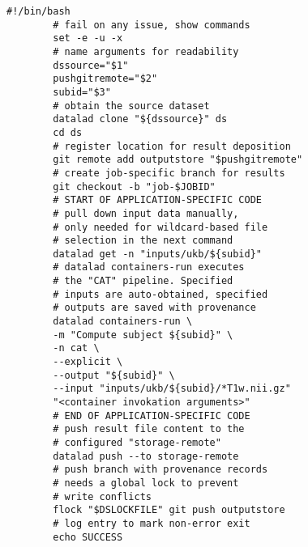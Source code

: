 \begin{Listing}
	\centering
	\begin{lstlisting}[multicols=2]
		#!/bin/bash
		# fail on any issue, show commands
		set -e -u -x
		# name arguments for readability
		dssource="$1"
		pushgitremote="$2"
		subid="$3"
		# obtain the source dataset
		datalad clone "${dssource}" ds
		cd ds
		# register location for result deposition
		git remote add outputstore "$pushgitremote"
		# create job-specific branch for results
		git checkout -b "job-$JOBID"
		# START OF APPLICATION-SPECIFIC CODE
		# pull down input data manually,
		# only needed for wildcard-based file
		# selection in the next command
		datalad get -n "inputs/ukb/${subid}"
		# datalad containers-run executes
		# the "CAT" pipeline. Specified
		# inputs are auto-obtained, specified
		# outputs are saved with provenance
		datalad containers-run \
		-m "Compute subject ${subid}" \
		-n cat \
		--explicit \
		--output "${subid}" \
		--input "inputs/ukb/${subid}/*T1w.nii.gz"
		"<container invokation arguments>"
		# END OF APPLICATION-SPECIFIC CODE
		# push result file content to the
		# configured "storage-remote"
		datalad push --to storage-remote
		# push branch with provenance records
		# needs a global lock to prevent
		# write conflicts
		flock "$DSLOCKFILE" git push outputstore
		# log entry to mark non-error exit
		echo SUCCESS
	\end{lstlisting}


\end{Listing}
